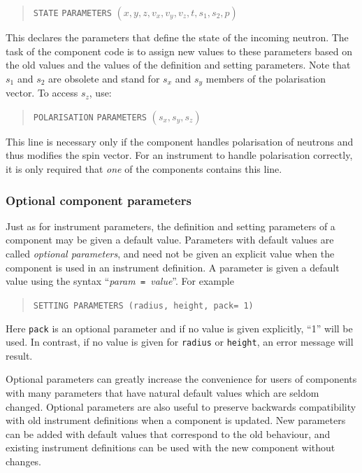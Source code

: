 \begin{quote}
  \texttt{STATE} \texttt{PARAMETERS} $(x,y,z,v_x,v_y,v_z,t,s_1,s_2,p)$
\end{quote}
This declares the parameters that define the state of the incoming
neutron. The task of the component code is to assign new values to these
parameters based on the old values and the values of the definition and
setting parameters. Note that $s_1$ and $s_2$ are obsolete and stand for
$s_x$ and $s_y$ members of the polarisation vector. To access $s_z$, use:
\begin{quote}
  \texttt{POLARISATION} \texttt{PARAMETERS} $(s_x,s_y,s_z)$
\end{quote}
This line is necessary only if the component handles polarisation of neutrons
and thus modifies the spin vector. For an instrument to handle polarisation
correctly, it is only required that {\em one} of the components contains this
line.

\subsubsection{Optional component parameters}

Just as for instrument parameters, the definition and setting parameters of a
component may be given a default value. Parameters with default values are
called \emph{optional parameters}, and need not be given an explicit value when
the component is used in an instrument definition. A parameter is given a
default value using the syntax ``\textit{param}\texttt{ = }\textit{value}''.
For example
\begin{quote}
  \texttt{SETTING PARAMETERS (radius, height, pack= 1)}
\end{quote}
Here \verb+pack+ is an optional parameter and if no value is given
explicitly, ``1'' will be used. In contrast, if no value is
  given for \texttt{radius} or \texttt{height}, an error message will
  result.

  Optional parameters can greatly increase the convenience for users of
  components with many parameters that have natural default values which are
  seldom changed. Optional parameters are also useful to preserve backwards
  compatibility with old instrument definitions when a component is updated. New
  parameters can be added with default values that correspond to the old
  behaviour, and existing instrument definitions can be used with the new
  component without changes.

